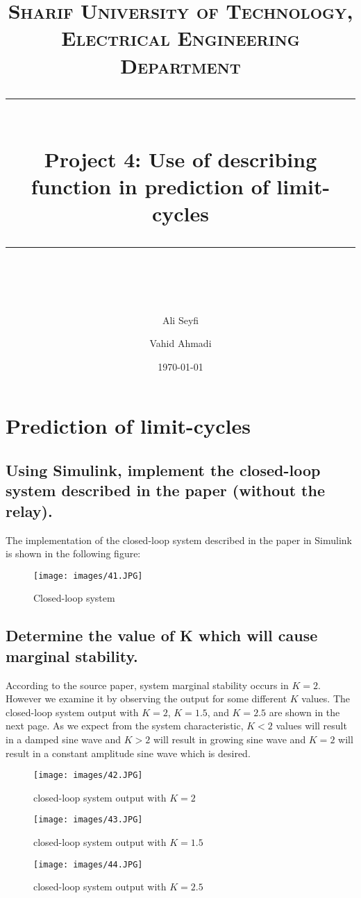\documentclass[11pt]{scrartcl} %
\title{	
	\normalfont\normalsize
	\textsc{Sharif University of Technology, Electrical Engineering Department}\\ %
	\vspace{25pt} %
	\rule{\linewidth}{0.5pt}\\ %
	\vspace{20pt} %
	{\huge Project 4: Use of describing function in prediction of limit-cycles}\\ %
	\vspace{12pt} %
	\rule{\linewidth}{2pt}\\ %
	\vspace{12pt} %
}
\author{\LARGE Ali Seyfi \and \LARGE Vahid Ahmadi}
\date{\normalsize\today}
\begin{document}
\maketitle
\section{Prediction of limit-cycles}
\subsection{Using Simulink, implement the closed-loop system described in the paper (without the relay).}
The implementation of the closed-loop system described in the paper in Simulink is shown in the following figure:
\begin{figure}[H]
	\centering
	\texttt{[image: images/41.JPG]}
	\caption{Closed-loop system}
\end{figure}
\subsection{Determine the value of K which will cause marginal stability.}
According to the source paper, system marginal stability occurs in $K=2$. However we examine it by observing the output for some different $K$ values. The closed-loop system output with $K=2$, $K=1.5$, and $K=2.5$ are shown in the next page. As we expect from the system characteristic, $K<2$ values will result in a damped sine wave and $K>2$ will result in growing sine wave and $K=2$ will result in a constant amplitude sine wave which is desired.
\begin{figure}[H]
	\centering
	\texttt{[image: images/42.JPG]}
	\caption{closed-loop system output with $K=2$}
\end{figure}
\begin{figure}[H]
	\centering
	\texttt{[image: images/43.JPG]}
	\caption{closed-loop system output with $K=1.5$}
\end{figure}
\begin{figure}[H]
	\centering
	\texttt{[image: images/44.JPG]}
	\caption{closed-loop system output with $K=2.5$}
\end{figure}
\end{document}
